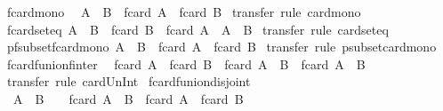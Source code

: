 \begin{isabellebody}
\isanewline
%
\endisadelimproof
\isanewline
{}\isamarkupfalse%
\ fcard{\isacharunderscore}mono{\isacharcolon}\isanewline
\ \ {\isachardoublequoteopen}A\ {\isacharbar}{\isasymsubseteq}{\isacharbar}\ B\ {\isasymLongrightarrow}\ fcard\ A\ {\isasymle}\ fcard\ B{\isachardoublequoteclose}\isanewline
%
\isadelimproof
%
\endisadelimproof
%
\isatagproof
{}\isamarkupfalse%
\ transfer\ {\isacharparenleft}rule\ card{\isacharunderscore}mono{\isacharparenright}%
\endisatagproof
{\isafoldproof}%
%
\isadelimproof
\isanewline
%
\endisadelimproof
\isanewline
{}\isamarkupfalse%
\ fcard{\isacharunderscore}seteq{\isacharcolon}\ {\isachardoublequoteopen}A\ {\isacharbar}{\isasymsubseteq}{\isacharbar}\ B\ {\isasymLongrightarrow}\ fcard\ B\ {\isasymle}\ fcard\ A\ {\isasymLongrightarrow}\ A\ {\isacharequal}\ B{\isachardoublequoteclose}\isanewline
%
\isadelimproof
%
\endisadelimproof
%
\isatagproof
{}\isamarkupfalse%
\ transfer\ {\isacharparenleft}rule\ card{\isacharunderscore}seteq{\isacharparenright}%
\endisatagproof
{\isafoldproof}%
%
\isadelimproof
\isanewline
%
\endisadelimproof
\isanewline
{}\isamarkupfalse%
\ pfsubset{\isacharunderscore}fcard{\isacharunderscore}mono{\isacharcolon}\ {\isachardoublequoteopen}A\ {\isacharbar}{\isasymsubset}{\isacharbar}\ B\ {\isasymLongrightarrow}\ fcard\ A\ {\isacharless}\ fcard\ B{\isachardoublequoteclose}\isanewline
%
\isadelimproof
%
\endisadelimproof
%
\isatagproof
{}\isamarkupfalse%
\ transfer\ {\isacharparenleft}rule\ psubset{\isacharunderscore}card{\isacharunderscore}mono{\isacharparenright}%
\endisatagproof
{\isafoldproof}%
%
\isadelimproof
\isanewline
%
\endisadelimproof
\isanewline
{}\isamarkupfalse%
\ fcard{\isacharunderscore}funion{\isacharunderscore}finter{\isacharcolon}\isanewline
\ \ {\isachardoublequoteopen}fcard\ A\ {\isacharplus}\ fcard\ B\ {\isacharequal}\ fcard\ {\isacharparenleft}A\ {\isacharbar}{\isasymunion}{\isacharbar}\ B{\isacharparenright}\ {\isacharplus}\ fcard\ {\isacharparenleft}A\ {\isacharbar}{\isasyminter}{\isacharbar}\ B{\isacharparenright}{\isachardoublequoteclose}\isanewline
%
\isadelimproof
%
\endisadelimproof
%
\isatagproof
{}\isamarkupfalse%
\ transfer\ {\isacharparenleft}rule\ card{\isacharunderscore}Un{\isacharunderscore}Int{\isacharparenright}%
\endisatagproof
{\isafoldproof}%
%
\isadelimproof
\isanewline
%
\endisadelimproof
\isanewline
{}\isamarkupfalse%
\ fcard{\isacharunderscore}funion{\isacharunderscore}disjoint{\isacharcolon}\isanewline
\ \ {\isachardoublequoteopen}A\ {\isacharbar}{\isasyminter}{\isacharbar}\ B\ {\isacharequal}\ {\isacharbraceleft}{\isacharbar}{\isacharbar}{\isacharbraceright}\ {\isasymLongrightarrow}\ fcard\ {\isacharparenleft}A\ {\isacharbar}{\isasymunion}{\isacharbar}\ B{\isacharparenright}\ {\isacharequal}\ fcard\ A\ {\isacharplus}\ fcard\ B{\isachardoublequoteclose}\isanewline

\end{isabellebody}
